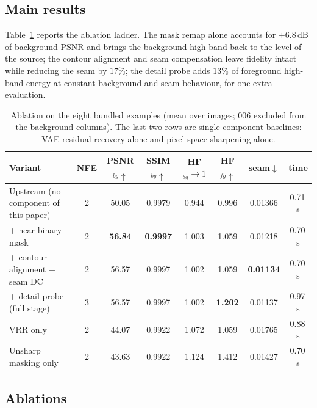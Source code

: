 \documentclass[10pt,twocolumn,letterpaper]{article}
\begin{document}
\subsection{Main results}

Table~\ref{tab:main} reports the ablation ladder. The mask remap alone accounts
for $+6.8$\,dB of background PSNR and brings the background high band back to the
level of the source; the contour alignment and seam compensation leave fidelity
intact while reducing the seam by $17\%$; the detail probe adds $13\%$ of
foreground high-band energy at constant background and seam behaviour, for one
extra evaluation.

\begin{table}[t]
\centering
\small
\setlength{\tabcolsep}{6pt}
\begin{tabular}{lccccccc}
\toprule
Variant & NFE & PSNR$_{bg}\uparrow$ & SSIM$_{bg}\uparrow$ &
HF$_{bg}\to 1$ & HF$_{fg}\uparrow$ & seam$\downarrow$ & time \\
\midrule
Upstream (no component of this paper)  & 2 & 50.05 & 0.9979 & 0.944 & 0.996 & 0.01366 & 0.71\,s \\
+ near-binary mask                     & 2 & \textbf{56.84} & \textbf{0.9997} & 1.003 & 1.059 & 0.01218 & 0.70\,s \\
+ contour alignment + seam DC          & 2 & 56.57 & 0.9997 & 1.002 & 1.059 & \textbf{0.01134} & 0.70\,s \\
+ detail probe (full stage)            & 3 & 56.57 & 0.9997 & 1.002 & \textbf{1.202} & 0.01137 & 0.97\,s \\
\midrule
VRR only                               & 2 & 44.07 & 0.9922 & 1.072 & 1.059 & 0.01765 & 0.88\,s \\
Unsharp masking only                   & 2 & 43.63 & 0.9922 & 1.124 & 1.412 & 0.01427 & 0.70\,s \\
\bottomrule
\end{tabular}
\caption{Ablation on the eight bundled examples (mean over images; 006 excluded
from the background columns). The last two rows are single-component baselines:
VAE-residual recovery alone and pixel-space sharpening alone.}
\label{tab:main}
\end{table}

\subsection{Ablations}
\label{sec:ablate}
\end{document}
